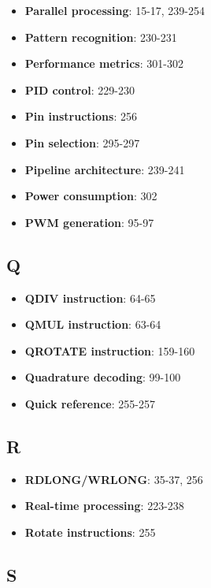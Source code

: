 \documentclass[11pt]{book}
\providecommand{\tightlist}{%
  \setlength{\itemsep}{0pt}\setlength{\parskip}{0pt}}
\begin{document}
\begin{itemize}
\tightlist
\item
  \textbf{Parallel processing}: 15-17, 239-254
\item
  \textbf{Pattern recognition}: 230-231
\item
  \textbf{Performance metrics}: 301-302
\item
  \textbf{PID control}: 229-230
\item
  \textbf{Pin instructions}: 256
\item
  \textbf{Pin selection}: 295-297
\item
  \textbf{Pipeline architecture}: 239-241
\item
  \textbf{Power consumption}: 302
\item
  \textbf{PWM generation}: 95-97
\end{itemize}

\hypertarget{q}{%
\subsection{Q}\label{q}}

\begin{itemize}
\tightlist
\item
  \textbf{QDIV instruction}: 64-65
\item
  \textbf{QMUL instruction}: 63-64
\item
  \textbf{QROTATE instruction}: 159-160
\item
  \textbf{Quadrature decoding}: 99-100
\item
  \textbf{Quick reference}: 255-257
\end{itemize}

\hypertarget{r}{%
\subsection{R}\label{r}}

\begin{itemize}
\tightlist
\item
  \textbf{RDLONG/WRLONG}: 35-37, 256
\item
  \textbf{Real-time processing}: 223-238
\item
  \textbf{Rotate instructions}: 255
\end{itemize}

\hypertarget{s}{%
\subsection{S}\label{s}}
\end{document}
